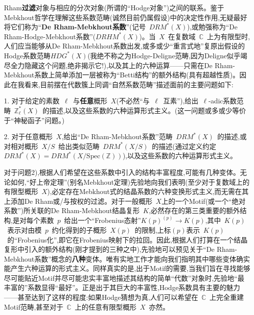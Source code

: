 Rham\textbf{过滤}对象与相应的分次对象(所谓的“Hodge对象”)之间的联系。鉴于Mebkhout哲学在理解这些系数范畴(诚然目前仍属假设)中的决定性作用,无疑最好将它们称为“\textbf{De Rham-Mebkhout系数}”(记号~$DRM^*(X)$),或勉强称为“De Rham-Hodge-Mebkhout系数”($DRHM^*(X)$)。当~$X$~在复数域~$\mathbb{C}$~上为有限型时,人们应当能够从De Rham-Mebkhout系数出发,或多或少“重言式地”复原出假设的Hodge系数范畴\dmark{}$HDG^*(X)$(我绝不称之为Hodge-Deligne范畴,因为Deligne似乎竭尽全力隐藏这个问题,绝非揭示它!),以及其上的六种运算——只需在De Rham-Mebkhout系数上简单添加一层被称为“Betti结构”的额外结构(具有超越性质)。因此在我看来,目前摆在代数簇上同调“自然系数范畴”描述面前的主要问题如下:

1. 对于给定的素数~$\ell$~与\textbf{任意}概形~$X$(不必然“与~$\ell$~互素”),给出~$\ell$-adic系数范畴~$\mathbb{Z}_\ell^*(X)$~的描述,以及这些系数的六种运算形式主义。(这一问题或多或少等价于“神秘函子”问题。)

2. 对于任意概形~$X$,给出“De Rham-Mebkhout系数”范畴~$DRM^*(X)$~的描述,或对相对概形~$X/S$~给出类似范畴~$DRM^*(X/S)$~的描述(通过定义约定~$DRM^*(X)=DRM^*(X/\mathrm{Spec}(\mathbb{Z}))$),以及这些系数的六种运算形式主义。

对于问题2),根据人们希望在这些系数中引入的结构丰富程度,可能有几种变体。无论如何,“好上帝定理”(别名Mebkhout定理)先验地向我们表明(至少对于复数域上的有限型概形~$X$),必定存在Mebkhout式的结晶系数的六种变换形式主义,而无需在其上添加De Rham或/与按权的过滤。对于一般概形~$X$上的一个Motif(或一个“绝对系数”)所关联的De Rham-Mebkhout结晶复形~$K$,必然存在的第三类重要的额外结构,是对每个素数~$p$~给出一个“Frobenius态射”$K(p)^{(p)}\to K(p)$,其中~$K(p)$~表示对由模~$p$~约化得到的子概形~$X(p)$~的限制,上标$(p)$表示~$K(p)$~的“Frobenius化”,即它在Frobenius映射下的拉回。因此,根据人们打算在一个结晶复形中引入的额外结构(刚才提到的三种之中),先验地可以预见关于“De Rham-Mebkhout系数”概念的\textbf{八种}变体。唯有实地工作\dmark{}才能向我们指明其中哪些变体确实能产生六种运算的形式主义。同样真实的是,出于Motif的需要,当我们旨在寻找能够尽可能贴近Motif并尽可能忠实丰富地描述其结构的简单“代数”对象时,先验地“最丰富的”系数显得“最好”。正是出于其巨大的丰富性,Hodge系数具有主要的魅力——甚至达到了这样的程度:如果Hodge猜想为真,人们可以希望在~$\mathbb{C}$~上完全重建Motif范畴,甚至对于~$\mathbb{C}$~上的任意有限型概形~$X$~亦然。

